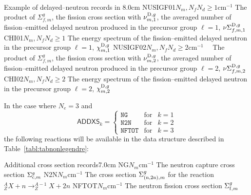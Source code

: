 \begin{DescriptionEnregistrement}{Example of delayed--neutron records in
}{8.0cm}
\OptRealEnr
  {NUSIGF01}{$N_{m},N_{f}$}{$N_{d}\ge 1$}{cm$^{-1}$} 
  {The product of $\Sigma_{f,m}^{g}$, the fission cross section with
   $\nu_{m,1}^{{\rm D},g}$, the averaged number of fission--emitted delayed
   neutron produced in the precursor group $\ell=1$,
   $\nu\Sigma_{f,m,1}^{{\rm D},g}$}
\OptRealEnr
  {CHI01}{$N_{m},N_{f}$}{$N_{d}\ge 1$}{}
  {The energy spectrum of the fission--emitted delayed neutron
  in the precursor group $\ell=1$, $\chi_{m,1}^{{\rm D},g}$}
\OptRealEnr
  {NUSIGF02}{$N_{m},N_{f}$}{$N_{d}\ge 2$}{cm$^{-1}$~~} 
  {The product of $\Sigma_{f,m}^{g}$, the fission cross section with
   $\nu_{m,2}^{{\rm D},g}$, the averaged number of fission--emitted delayed
   neutron produced in the precursor group $\ell=2$,
   $\nu\Sigma_{f,m,2}^{{\rm D},g}$}
\OptRealEnr
  {CHI02}{$N_{m},N_{f}$}{$N_{d}\ge 2$}{}
  {The energy spectrum of the fission--emitted delayed neutron
  in the precursor group $\ell=2$, $\chi_{m,2}^{{\rm D},g}$}
\end{DescriptionEnregistrement}

\vskip 0.2cm

In the case where $N_{e}=3$ and
\begin{displaymath}
\mathsf{ADDXS}_{k} = \left\{
\begin{array}{lll}
\mathtt{NG} & \textrm{for} & k=1\\
\mathtt{N2N}& \textrm{for} & k=2\\
\mathtt{NFTOT}& \textrm{for} & k=3
\end{array} \right.
\end{displaymath}
the following reactions will be available in the data structure described
in Table~\ref{tabl:tabnonlegendre}:

\begin{DescriptionEnregistrement}{Additional cross section records}{7.0cm}
\RealEnr
  {NG}{$N_{m}$}{cm$^{-1}$}
  {The neutron capture cross section $\Sigma_{{\rm c},m}^{g}$}
\RealEnr
  {N2N}{$N_{m}$}{cm$^{-1}$}
  {The cross section
   $\Sigma_{{\rm (n,2n)},m}^{g}$ for the reaction 
   $^{A}_{Z}X+n \to ^{A-1}_{Z}X+2n$}
\RealEnr
  {NFTOT}{$N_{m}$}{cm$^{-1}$}
  {The neutron fission cross section $\Sigma_{{\rm f},m}^{g}$}
\end{DescriptionEnregistrement}

